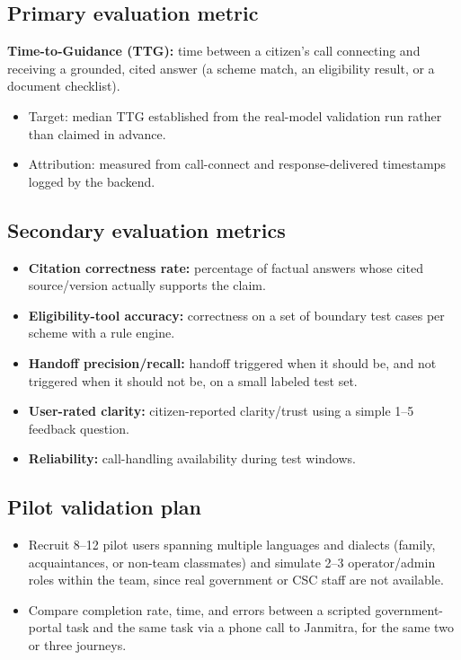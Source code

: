 \documentclass[11pt,a4paper]{article}
\begin{document}
\subsection{Primary evaluation metric}
\textbf{Time-to-Guidance (TTG):} time between a citizen's call connecting and receiving a grounded, cited answer (a scheme match, an eligibility result, or a document checklist).
\begin{itemize}[leftmargin=0.7cm]
    \item Target: median TTG established from the real-model validation run rather than claimed in advance.
    \item Attribution: measured from call-connect and response-delivered timestamps logged by the backend.
\end{itemize}

\subsection{Secondary evaluation metrics}
\begin{itemize}[leftmargin=0.7cm]
    \item \textbf{Citation correctness rate:} percentage of factual answers whose cited source/version actually supports the claim.
    \item \textbf{Eligibility-tool accuracy:} correctness on a set of boundary test cases per scheme with a rule engine.
    \item \textbf{Handoff precision/recall:} handoff triggered when it should be, and not triggered when it should not be, on a small labeled test set.
    \item \textbf{User-rated clarity:} citizen-reported clarity/trust using a simple 1--5 feedback question.
    \item \textbf{Reliability:} call-handling availability during test windows.
\end{itemize}

\subsection{Pilot validation plan}
\begin{itemize}[leftmargin=0.7cm]
    \item Recruit 8--12 pilot users spanning multiple languages and dialects (family, acquaintances, or non-team classmates) and simulate 2--3 operator/admin roles within the team, since real government or CSC staff are not available.
    \item Compare completion rate, time, and errors between a scripted government-portal task and the same task via a phone call to Janmitra, for the same two or three journeys.
\end{itemize}
\end{document}
